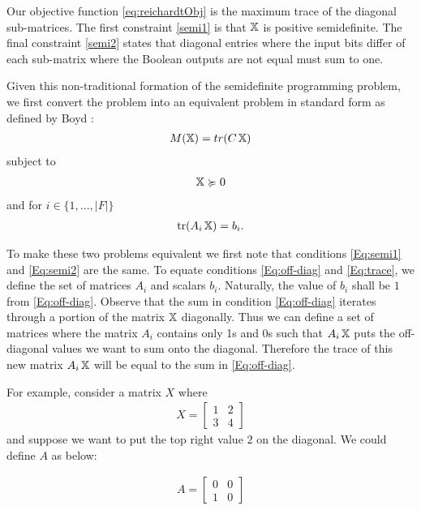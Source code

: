 Our objective function \cref{eq:reichardtObj} is
the maximum trace of the diagonal sub-matrices. The
first constraint \cref{semi1} is that $\operatorname{\mathbb{X}}$ is positive
semidefinite. The final constraint \cref{semi2} states that
diagonal entries where the input bits differ
of each sub-matrix where the Boolean outputs are not equal must sum to one.

Given this non-traditional formation of the semidefinite programming problem, we first convert the problem into an equivalent problem in standard form as defined by Boyd \cite{boyd2004convex}:
\begin{align}
    M(\operatorname{\mathbb{X}}) = tr(C\operatorname{\mathbb{X}}) 
\end{align}
subject to
\begin{align}\label{Eq:semi2}
    \operatorname{\mathbb{X}} \succcurlyeq 0   
\end{align}
and for $i \in \{1,...,|F|\}$
\begin{align}\label{Eq:trace}
    \operatorname{\text{tr}}(A_i \operatorname{\mathbb{X}}) = b_i. 
\end{align}


To make these two problems equivalent we first note that
conditions \cref{Eq:semi1} and \cref{Eq:semi2} are
the same.
To equate conditions \cref{Eq:off-diag}
and \cref{Eq:trace}, we define the set of matrices
$A_i$ and
scalars $b_i$.
Naturally, the value of $b_i$ shall be $1$
from \cref{Eq:off-diag}.
Observe that the sum in condition \cref{Eq:off-diag}
iterates through a portion of the matrix $\operatorname{\mathbb{X}}$ diagonally.
Thus we can define a set of matrices where the matrix 
$A_i$ contains only 1s and 0s 
such that $A_i \operatorname{\mathbb{X}}$ puts the off-diagonal values we want
to sum onto the diagonal.
Therefore the trace of this new matrix $A_i \operatorname{\mathbb{X}}$ 
will be equal to the sum in \cref{Eq:off-diag}.

For example, consider a matrix $X$ where
\begin{align}
    X = \left[ \begin{matrix} 1 & 2 \\ 3 & 4 \end{matrix} \right] \nonumber
\end{align}
and suppose we want to put the top right value $2$ on the diagonal.
We could define $A$ as below:

\begin{align}
    A = \left[ \begin{matrix} 0 & 0 \\ 1 & 0 \end{matrix} \right] \nonumber
\end{align}

